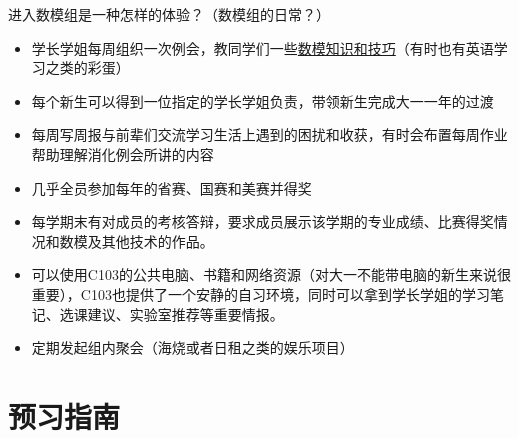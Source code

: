 \documentclass{beamer}
\begin{document}
\begin{frame}
\begin{block}{进入数模组是一种怎样的体验？（数模组的日常？）}
\begin{itemize}
   \item 学长学姐每周组织一次例会，教同学们一些\hyperlink{content}{数模知识和技巧}（有时也有英语学习之类的彩蛋）
   \item 每个新生可以得到一位指定的学长学姐负责，带领新生完成大一一年的过渡
   \item 每周写周报与前辈们交流学习生活上遇到的困扰和收获，有时会布置每周作业帮助理解消化例会所讲的内容
   \item 几乎全员参加每年的省赛、国赛和美赛并得奖
   \item 每学期末有对成员的考核答辩，要求成员展示该学期的专业成绩、比赛得奖情况和数模及其他技术的作品。
   \item 可以使用C103的公共电脑、书籍和网络资源（对大一不能带电脑的新生来说很重要），C103也提供了一个安静的自习环境，同时可以拿到学长学姐的学习笔记、选课建议、实验室推荐等重要情报。
   \item 定期发起组内聚会（海烧或者日租之类的娱乐项目）
\end{itemize}
\end{block}
\end{frame}

\section{预习指南}\label{sec:preview}
\end{document}

